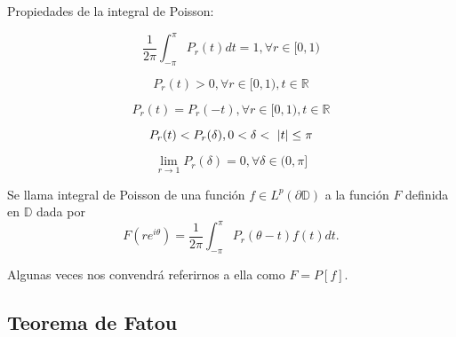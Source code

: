 \bigskip

Propiedades de la integral de Poisson:

\begin{equation}
    \dfrac{1}{2 \pi} \int_{- \pi}^{\pi} P_r (t) dt = 1, \forall r \in [0,1)
\end{equation}

\begin{equation}
    P_r(t) > 0, \forall r \in [0,1), t \in \mathbb{R}
\end{equation}

\begin{equation}
    P_r(t) = P_r(-t), \forall r \in [0,1), t \in \mathbb{R}
\end{equation}

\begin{equation}
    P_r(t) < P_r(\delta), 0 < \delta < \abs{t} \leq \pi
\end{equation}

\begin{equation}
    \lim_{r \rightarrow 1} P_r(\delta) = 0, \forall \delta \in (0,\pi]
\end{equation}

\medskip

\begin{definition}
    Se llama integral de Poisson de una función $f \in L^p(\partial \mathbb{D})$ a la función $F$ definida en $\mathbb{D}$ dada por
    \begin{equation*}
        F(re^{i \theta}) = \dfrac{1}{2 \pi} \int_{- \pi}^{\pi} P_r (\theta - t) f(t) dt.
    \end{equation*}

    Algunas veces nos convendrá referirnos a ella como $F=P[f]$.
\end{definition}

\subsection{Teorema de Fatou}

